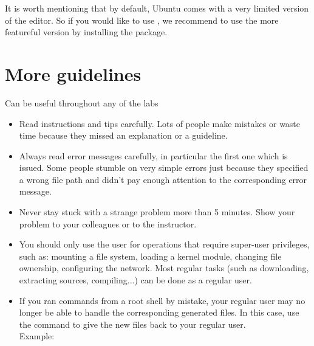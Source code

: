It is worth mentioning that by default, Ubuntu comes with a very
limited version of the  editor. So if you would like to use
, we recommend to use the more featureful version by
installing the  package.

\section{More guidelines}

Can be useful throughout any of the labs

\begin{itemize}

\item Read instructions and tips carefully. Lots of people make
  mistakes or waste time because they missed an explanation or a
  guideline.

\item Always read error messages carefully, in particular the first
  one which is issued. Some people stumble on very simple errors just
  because they specified a wrong file path and didn't pay enough
  attention to the corresponding error message.

\item Never stay stuck with a strange problem more than 5
  minutes. Show your problem to your colleagues or to the instructor.

\item You should only use the  user for operations that require
  super-user privileges, such as: mounting a file system, loading a
  kernel module, changing file ownership, configuring the
  network. Most regular tasks (such as downloading, extracting
  sources, compiling...) can be done as a regular user.

\item If you ran commands from a root shell by mistake, your regular
  user may no longer be able to handle the corresponding generated
  files. In this case, use the  command to give the new
  files back to your regular user.\\
  Example: 

\end{itemize}

